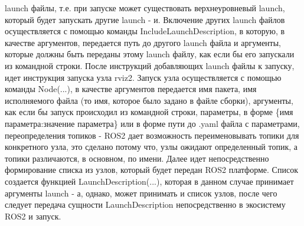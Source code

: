 \documentclass[a4paper, 14pt]{extreport}
\begin{document}
launch файлы, т.е. при запуске может существовать верхнеуровневый launch, который будет запускать другие launch - и. Включение других
launch файлов осуществляется с помощью команды IncludeLaunchDescription, в которую, в качестве аргументов, передается путь до другого
launch файла и аргументы, которые должны быть переданы этому launch файлу, как если бы его запускали из командной строки. После инструкций
добавляющих launch файлы к запуску, идет инструкция запуска узла rviz2. Запуск узла осуществляется с помощью команды Node(...), в качестве
аргументов передается имя пакета, имя исполняемого файла (то имя, которое было задано в файле сборки), аргументы, как если бы запуск
происходил из командной строки, параметры, в форме \{имя параметра:значение параметра\} или в форме пути до .yaml файла с параметрами,
переопределения топиков - ROS2 дает возможность переименовывать топики для конкретного узла, это сделано потому что, узлы ожидают
определенный топик, а топики различаются, в основном, по имени. Далее идет непосредственно формирование списка из узлов, который 
будет передан ROS2 платформе. Список создается функцией LaunchDescription(...), которая в данном случае принимает аргументы launch - а,
однако, может принимать и список узлов, после чего следует передача сущности LaunchDescription непосредственно в экосистему ROS2 и 
запуск.
\end{document}
